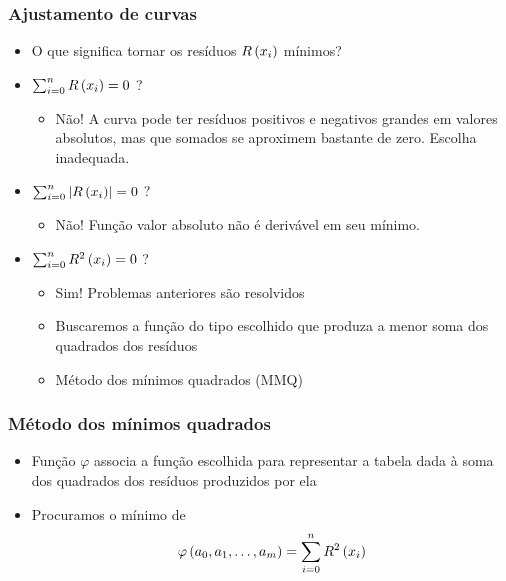 \begin{frame}
\frametitle{Ajustamento de curvas}

\begin{itemize}
  \item O que significa tornar os resíduos $R\left(x_i\right)$ mínimos?
  \item $\sum_{i=0}^n R\left(x_i\right) = 0$ ?
    \begin{itemize}
      \item Não! A curva pode ter resíduos positivos e negativos grandes em valores absolutos, mas que somados se aproximem bastante de zero. Escolha inadequada.
    \end{itemize}
  \item $\sum_{i=0}^n \left|R\left(x_i\right)\right| = 0$ ?
    \begin{itemize}
      \item Não! Função valor absoluto não é derivável em seu mínimo. 
    \end{itemize}  
  \item $\sum_{i=0}^n R^2\left(x_i\right) = 0$ ?
    \begin{itemize}
      \item Sim! Problemas anteriores são resolvidos
      \item Buscaremos a função do tipo escolhido que produza a menor soma dos quadrados dos resíduos
      \item Método dos mínimos quadrados (MMQ)
    \end{itemize}
\end{itemize}
\end{frame}

\begin{frame}
\frametitle{Método dos mínimos quadrados}

\begin{itemize}
  \item Função $\varphi$ associa a função escolhida para representar a tabela dada à soma dos quadrados dos resíduos produzidos por ela
  \item Procuramos o mínimo de\\
  \[\varphi\left(a_0,a_1,\ldots,a_m\right) = \sum_{i=0}^{n}R^2\left(x_i\right)\]
\end{itemize}
\end{frame}

